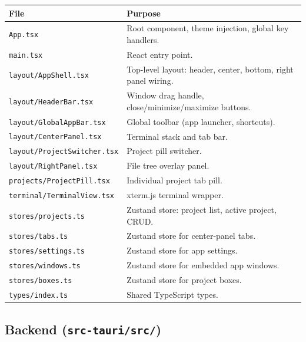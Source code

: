 \documentclass[11pt,a4paper]{article}
\newcommand{\code}[1]{\texttt{#1}}
\begin{document}
\begin{longtable}{@{}p{6.2cm}p{8.4cm}@{}}
\toprule
\textbf{File} & \textbf{Purpose} \\
\midrule
\endhead
\code{App.tsx}                       & Root component, theme injection, global key handlers. \\
\code{main.tsx}                      & React entry point. \\
\code{layout/AppShell.tsx}           & Top-level layout: header, center, bottom, right panel wiring. \\
\code{layout/HeaderBar.tsx}          & Window drag handle, close/minimize/maximize buttons. \\
\code{layout/GlobalAppBar.tsx}       & Global toolbar (app launcher, shortcuts). \\
\code{layout/CenterPanel.tsx}        & Terminal stack and tab bar. \\
\code{layout/ProjectSwitcher.tsx}    & Project pill switcher. \\
\code{layout/RightPanel.tsx}         & File tree overlay panel. \\
\code{projects/ProjectPill.tsx}      & Individual project tab pill. \\
\code{terminal/TerminalView.tsx}     & xterm.js terminal wrapper. \\
\code{stores/projects.ts}            & Zustand store: project list, active project, CRUD. \\
\code{stores/tabs.ts}                & Zustand store for center-panel tabs. \\
\code{stores/settings.ts}            & Zustand store for app settings. \\
\code{stores/windows.ts}             & Zustand store for embedded app windows. \\
\code{stores/boxes.ts}               & Zustand store for project boxes. \\
\code{types/index.ts}                & Shared TypeScript types. \\
\bottomrule
\end{longtable}

\subsection{Backend (\code{src-tauri/src/})}
\end{document}
